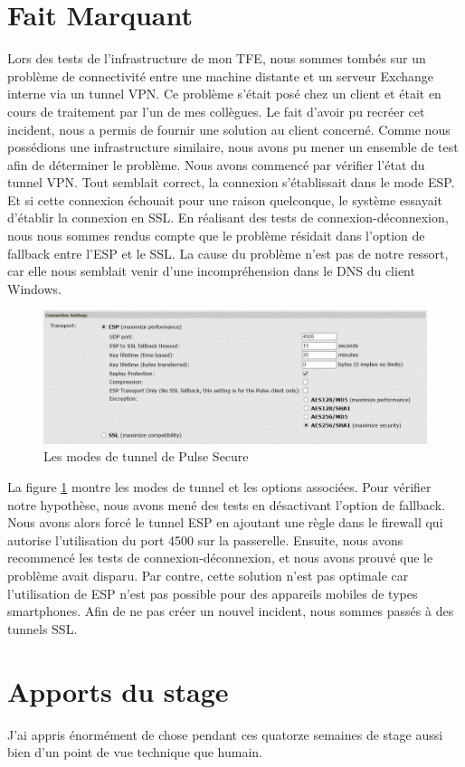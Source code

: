 \section{Fait Marquant}
Lors des tests de l'infrastructure de mon TFE, nous sommes tombés sur un problème de connectivité entre une machine distante et un serveur Exchange interne via un tunnel VPN. 
Ce problème s'était posé chez un client et était en cours de traitement par l'un de mes collègues.
Le fait d'avoir pu recréer cet incident, nous a permis de fournir une solution au client concerné. 
Comme nous possédions une infrastructure similaire, nous avons pu mener un ensemble de test afin de déterminer le problème.
Nous avons commencé par vérifier l'état du tunnel VPN.
Tout semblait correct, la connexion s'établissait dans le mode ESP.
Et si cette connexion échouait pour une raison quelconque, le système essayait d'établir la connexion en SSL.
En réalisant des tests de connexion-déconnexion, nous nous sommes rendus compte que le problème résidait dans l'option de fallback entre l'ESP et le SSL.
La cause du problème n'est pas de notre ressort, car elle nous semblait venir d'une incompréhension dans le DNS du client Windows.
\begin{figure}[!h]
\centering
\includegraphics[width=16cm]{fallbabkssl.png}
\caption{Les modes de tunnel de Pulse Secure}
\label{fig:ssl}
\end{figure}
La figure \ref{fig:ssl} montre les modes de tunnel et les options associées.
Pour vérifier notre hypothèse, nous avons mené des tests en désactivant l'option de fallback.
Nous avons alors forcé le tunnel ESP en ajoutant une règle dans le firewall qui autorise l'utilisation du port 4500 sur la passerelle.
Ensuite, nous avons recommencé les tests de connexion-déconnexion, et nous avons prouvé que le problème avait disparu.
Par contre, cette solution n'est pas optimale car l'utilisation de ESP n'est pas possible pour des appareils mobiles de types smartphones.
Afin de ne pas créer un nouvel incident, nous sommes passés à des tunnels SSL. 

\section{Apports du stage}
J'ai appris énormément de chose pendant ces quatorze semaines de stage aussi bien d'un point de vue technique que humain.

